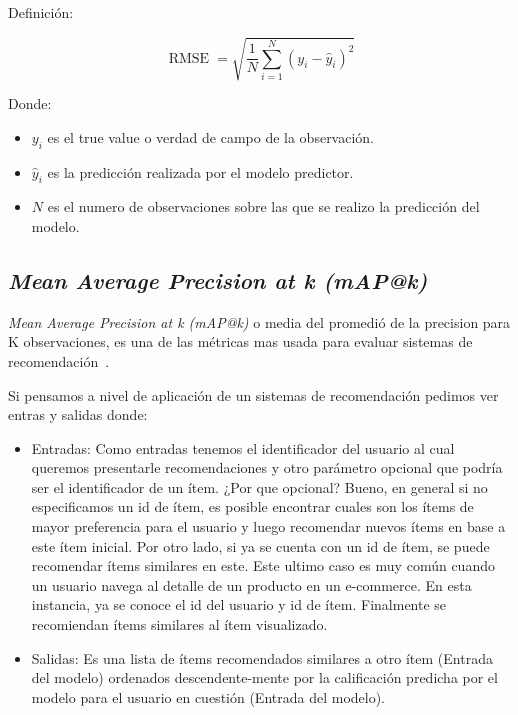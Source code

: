 \documentclass[11pt,a4paper,twoside]{thesis}
\begin{document}
\begin{description}
	\item[Definición:]
\end{description}
\begin{equation}
	\operatorname{RMSE}=\sqrt{  \frac{1}{N} \sum_{i=1}^N (y_i - \hat y_i)^2}
\end{equation}
\begin{description}
	\item[Donde:]
\end{description}
\begin{itemize}
	\item $y_i$ es el true value o verdad de campo de la observación.
	\item $\hat y_i$ es la predicción realizada por el modelo predictor.
	\item $N$ es el numero de observaciones sobre las que se realizo la predicción del modelo.
\end{itemize}

\subsection{\textit{Mean Average Precision at k (mAP@k)}}

\textit{Mean Average Precision at k (mAP@k)} o media del promedió de la precision para K observaciones, es una de las métricas mas usada para evaluar sistemas de recomendación~\cite{map_at_k_1, map_at_k_2, map_at_k_3}.

Si pensamos a nivel de aplicación de un sistemas de recomendación pedimos ver
entras y salidas donde:

\begin{itemize}
	\item Entradas: Como entradas tenemos el identificador del usuario al cual queremos
	      presentarle recomendaciones y otro parámetro opcional que podría ser el
	      identificador de un ítem. ¿Por que opcional? Bueno, en general si no
	      especificamos un id de ítem, es posible encontrar cuales son los ítems de mayor
	      preferencia para el usuario y luego recomendar nuevos ítems en base a este ítem
	      inicial. Por otro lado, si ya se cuenta con un id de ítem, se puede recomendar
	      ítems similares en este. Este ultimo caso es muy común cuando un usuario navega
	      al detalle de un producto en un e-commerce. En esta instancia, ya se conoce el
	      id del usuario y id de ítem. Finalmente se recomiendan ítems similares al ítem
	      visualizado.
	\item Salidas: Es una lista de ítems recomendados similares a otro ítem (Entrada del
	      modelo) ordenados descendente-mente por la calificación predicha por el modelo
	      para el usuario en cuestión (Entrada del modelo).
\end{itemize}
\end{document}
